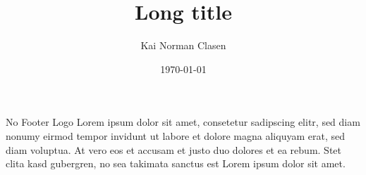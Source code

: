 \documentclass[aspectratio=169]{beamer}
\title[No footer logo]{Long title}
\author{Kai Norman Clasen}
\institute{}
\date{\today}
\begin{document}
\begin{frame}{No Footer Logo}
  Lorem ipsum dolor sit amet, consetetur sadipscing elitr,
  sed diam nonumy eirmod tempor invidunt ut labore et dolore
  magna aliquyam erat, sed diam voluptua.
  At vero eos et accusam et justo duo dolores et ea rebum.
  Stet clita kasd gubergren, no sea takimata sanctus est
  Lorem ipsum dolor sit amet.
\end{frame}
\end{document}

